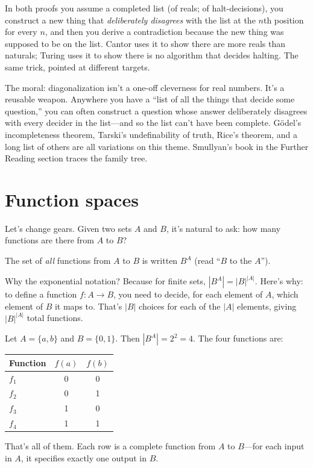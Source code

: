 \documentclass[11pt]{article}
\begin{document}
In both proofs you assume a completed list (of reals; of halt-decisions), you construct a new thing that \emph{deliberately disagrees} with the list at the $n$th position for every $n$, and then you derive a contradiction because the new thing was supposed to be on the list. Cantor uses it to show there are more reals than naturals; Turing uses it to show there is no algorithm that decides halting. The same trick, pointed at different targets.

The moral: diagonalization isn't a one-off cleverness for real numbers. It's a reusable weapon. Anywhere you have a ``list of all the things that decide some question,'' you can often construct a question whose answer deliberately disagrees with every decider in the list---and so the list can't have been complete. G\"odel's incompleteness theorem, Tarski's undefinability of truth, Rice's theorem, and a long list of others are all variations on this theme. Smullyan's book in the Further Reading section traces the family tree.

\section{Function spaces}

Let's change gears. Given two sets $A$ and $B$, it's natural to ask: how many functions are there from $A$ to $B$?

The set of \emph{all} functions from $A$ to $B$ is written $B^A$ (read ``$B$ to the $A$'').

Why the exponential notation? Because for finite sets, $|B^A| = |B|^{|A|}$. Here's why: to define a function $f : A \to B$, you need to decide, for each element of $A$, which element of $B$ it maps to. That's $|B|$ choices for each of the $|A|$ elements, giving $|B|^{|A|}$ total functions.

\begin{example}
Let $A = \{a, b\}$ and $B = \{0, 1\}$. Then $|B^A| = 2^2 = 4$. The four functions are:
\begin{center}
\begin{tabular}{lcc}
\toprule
Function & $f(a)$ & $f(b)$ \\
\midrule
$f_1$ & 0 & 0 \\
$f_2$ & 0 & 1 \\
$f_3$ & 1 & 0 \\
$f_4$ & 1 & 1 \\
\bottomrule
\end{tabular}
\end{center}
That's all of them. Each row is a complete function from $A$ to $B$---for each input in $A$, it specifies exactly one output in $B$.
\end{example}
\end{document}
